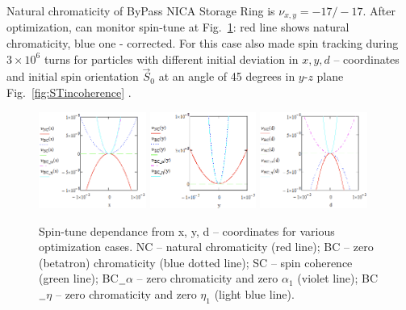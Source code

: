 \documentclass[a4paper]{jpconf}
\begin{document}
Natural chromaticity of ByPass NICA Storage Ring is $\nu_{x,y} = -17/-17$. After optimization, can monitor spin-tune at Fig.~\ref{fig:spintunes}: red line shows natural chromaticity, blue one - corrected. For this case also made spin tracking during $3\times10^{6}$ turns for particles with different initial deviation in $x,y,d$ -- coordinates and initial spin orientation $\vec{S}_{0}$ at an angle of 45 degrees in $y$-$z$ plane Fig.~\ref{fig:STincoherence} \cite{COSYINF}.

\begin{figure}[!h]
   \centering
   \includegraphics*[width=0.314\textwidth]{fig2}
   \includegraphics*[width=0.310\textwidth]{fig3}
   \includegraphics*[width=0.314\textwidth]{fig4}
   \caption{Spin-tune dependance from x, y, d -- coordinates for various optimization cases. NC -- natural chromaticity (red line); BC -- zero (betatron) chromaticity (blue dotted line); SC -- spin coherence (green line); BC$\underline {\hspace{0.2cm}}$$\alpha$ --  zero chromaticity and zero $\alpha_{1}$ (violet line); BC$\underline {\hspace{0.2cm}}$$\eta$ -- zero chromaticity and zero $\eta_{1}$ (light blue line).}
   \label{fig:spintunes}
\end{figure}
\end{document}
